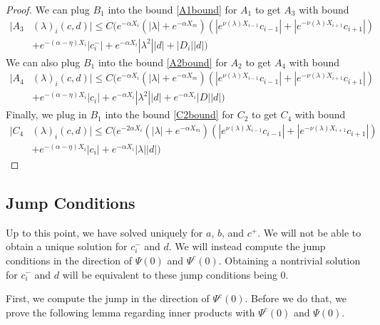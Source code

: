 \documentclass[thesis.tex]{subfiles}
\begin{document}
\begin{lemma}
\begin{proof}
We can plug $B_1$ into the bound \eqref{A1bound} for $A_1$ to get $A_3$ with bound
\begin{align*}
|A_3&(\lambda)_i(c, d)|
\leq C \Big(  
e^{-\alpha X_i} (|\lambda| + e^{-\alpha X_m})(|e^{\nu(\lambda)X_{i-1}} c_{i-1}| + |e^{-\nu(\lambda)X_{i+1}}c_{i+1}|) \\
&+ e^{-(\alpha - \eta)X_i}|c_i^-| + e^{-\alpha X_i} |\lambda^2||d| + |D_i||d| \Big)
\end{align*} 
We can also plug $B_1$ into the bound \eqref{A2bound} for $A_2$ to get $A_4$ with bound
\begin{align*}
|A_4&(\lambda)_i(c, d)|
\leq C \Big(  
e^{-\alpha X_i} (|\lambda| + e^{-\alpha X_m})(|e^{\nu(\lambda)X_{i-1}} c_{i-1}| + |e^{-\nu(\lambda)X_{i+1}}c_{i+1}|) \\
&+ e^{-(\alpha - \eta)X_i}|c_i| + e^{-\alpha X_i} |\lambda^2||d| + e^{-\alpha X_i}|D||d| \Big)
\end{align*} 
Finally, we plug in $B_1$ into the bound \eqref{C2bound} for $C_2$ to get $C_4$ with bound
\begin{align*}
|C_4&(\lambda)_i(c, d)|
\leq C \Big(  
e^{-2\alpha X_i} (|\lambda| + e^{-\alpha X_m})(|e^{\nu(\lambda)X_{i-1}} c_{i-1}| + |e^{-\nu(\lambda)X_{i+1}}c_{i+1}|) \\
&+ e^{-(\alpha - \eta)X_i}|c_i| + e^{-\alpha X_i}|\lambda||d| \Big)
\end{align*} 

\end{proof}
\end{lemma}

\subsection{Jump Conditions}
Up to this point, we have solved uniquely for $a$, $b$, and $c^+$. We will not be able to obtain a unique solution for $c_i^-$ and $d$. We will instead compute the jump conditions in the direction of $\Psi(0)$ and $\Psi^c(0)$. Obtaining a nontrivial solution for $c_i^-$ and $d$ will be equivalent to these jump conditions being 0.

First, we compute the jump in the direction of $\Psi^c(0)$. Before we do that, we prove the following lemma regarding inner products with $\Psi^c(0)$ and $\Psi(0)$.
\end{document}
